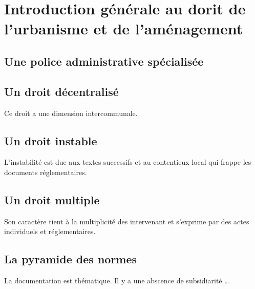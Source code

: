 \chapter{Introduction générale au dorit de l'urbanisme et de l'aménagement}

	\section{Une police administrative spécialisée}
	
	\section{Un droit décentralisé}
	
		Ce droit a une dimension intercommunale.
	
	\section{Un droit instable}
	
		L'instabilité est due aux textes successifs et au contentieux local qui frappe les documents réglementaires.
	
	\section{Un droit multiple}
	
		Son caractère tient à la multiplicité des intervenant et s'exprime par des actes individuels et réglementaires.
	
	\section{La pyramide des normes}
	
		La documentation est thématique. Il y a une abscence de subsidiarité \dots